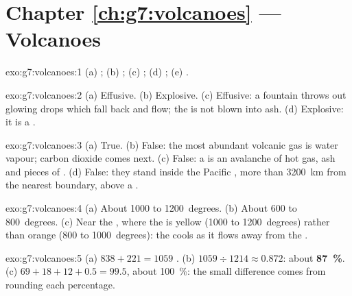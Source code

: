 \section*{Chapter \ref{ch:g7:volcanoes} --- Volcanoes}

\begin{solution}{exo:g7:volcanoes:1}
(a) ; (b) ; (c) ; (d) ; (e) .
\end{solution}

\begin{solution}{exo:g7:volcanoes:2}
(a) Effusive. (b) Explosive. (c) Effusive: a  fountain throws out
glowing drops which fall back and flow; the  is not blown into ash.
(d) Explosive: it is a .
\end{solution}

\begin{solution}{exo:g7:volcanoes:3}
(a) True. (b) False: the most abundant volcanic gas is water vapour;
carbon dioxide comes next. (c) False: a  is an avalanche
of hot gas, ash and pieces of . (d) False: they stand inside the
Pacific , more than 3200~km from the nearest boundary, above a
.
\end{solution}

\begin{solution}{exo:g7:volcanoes:4}
(a) About 1000 to 1200~degrees. (b) About 600 to 800~degrees. (c) Near the
, where the  is yellow (1000 to 1200~degrees) rather than orange
(800 to 1000~degrees): the  cools as it flows away from the .
\end{solution}

\begin{solution}{exo:g7:volcanoes:5}
(a) $838 + 221 = 1059$ . (b) $1059 \div 1214 \approx 0.872$:
about \textbf{87~\%}. (c) $69 + 18 + 12 + 0.5 = 99.5$, about 100~\%: the
small difference comes from rounding each percentage.
\end{solution}

